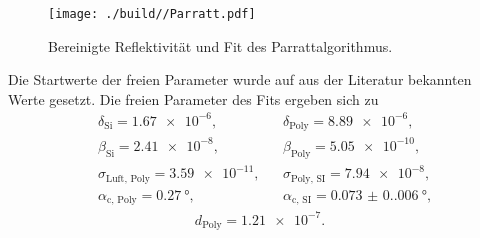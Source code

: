 \begin{figure}[H]
    \centering
    \texttt{[image: ./build//Parratt.pdf]}
    \caption{Bereinigte Reflektivität und Fit des Parrattalgorithmus.}
    \label{fig:Reflektivität3}
\end{figure}
\noindent
Die Startwerte der freien Parameter wurde auf aus der Literatur bekannten Werte gesetzt.
Die freien Parameter des Fits ergeben sich zu
\begin{align*}
    &\delta_{\text{Si}} = \SI{1.67e-6}, & & \delta_{\text{Poly}} = \SI{8.89e-6}, \\
    &\beta_{\text{Si}} = \SI{2.41e-8}, & &\beta_{\text{Poly}} = \SI{5.05e-10}, \\
    &\sigma_{\text{Luft, Poly}} = \SI{3.59e-11}, & & \sigma_{\text{Poly, SI}} = \SI{7.94e-8}, \\
    &\alpha_{\text{c, Poly}} = \SI{0.27}{\degree}, & & \alpha_{\text{c, SI}} = \SI{0.073(0.006)}{\degree}, 
\end{align*}
\begin{align*}
    d_{\text{Poly}} = \SI{1.21e-7}.
\end{align*}